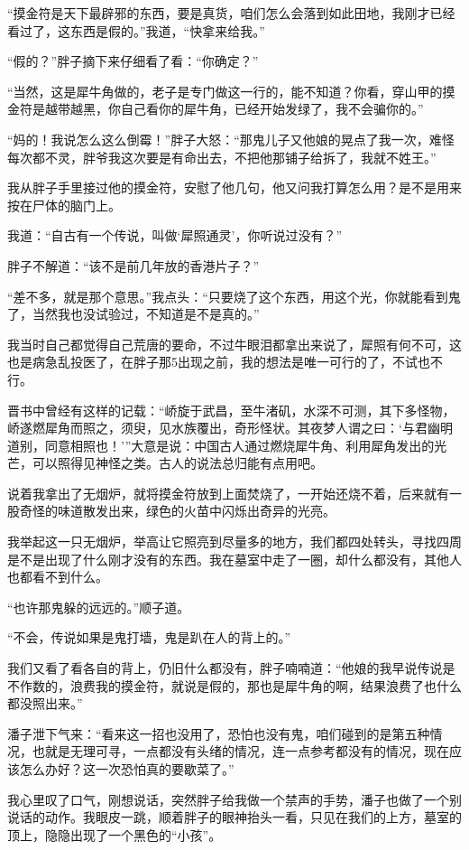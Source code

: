 “摸金符是天下最辟邪的东西，要是真货，咱们怎么会落到如此田地，我刚才已经看过了，这东西是假的。”我道，“快拿来给我。”

“假的？”胖子摘下来仔细看了看：“你确定？”

“当然，这是犀牛角做的，老子是专门做这一行的，能不知道？你看，穿山甲的摸金符是越带越黑，你自己看你的犀牛角，已经开始发绿了，我不会骗你的。”

“妈的！我说怎么这么倒霉！”胖子大怒：“那鬼儿子又他娘的晃点了我一次，难怪每次都不灵，胖爷我这次要是有命出去，不把他那铺子给拆了，我就不姓王。”

我从胖子手里接过他的摸金符，安慰了他几句，他又问我打算怎么用？是不是用来按在尸体的脑门上。

我道：“自古有一个传说，叫做‘犀照通灵’，你听说过没有？”

胖子不解道：“该不是前几年放的香港片子？”

“差不多，就是那个意思。”我点头：“只要烧了这个东西，用这个光，你就能看到鬼了，当然我也没试验过，不知道是不是真的。”

我当时自己都觉得自己荒唐的要命，不过牛眼泪都拿出来说了，犀照有何不可，这也是病急乱投医了，在胖子那5出现之前，我的想法是唯一可行的了，不试也不行。

晋书中曾经有这样的记载：“峤旋于武昌，至牛渚矶，水深不可测，其下多怪物，峤遂燃犀角而照之，须臾，见水族覆出，奇形怪状。其夜梦人谓之曰：‘与君幽明道别，同意相照也！’”大意是说：中国古人通过燃烧犀牛角、利用犀角发出的光芒，可以照得见神怪之类。古人的说法总归能有点用吧。

说着我拿出了无烟炉，就将摸金符放到上面焚烧了，一开始还烧不着，后来就有一股奇怪的味道散发出来，绿色的火苗中闪烁出奇异的光亮。

我举起这一只无烟炉，举高让它照亮到尽量多的地方，我们都四处转头，寻找四周是不是出现了什么刚才没有的东西。我在墓室中走了一圈，却什么都没有，其他人也都看不到什么。

“也许那鬼躲的远远的。”顺子道。

“不会，传说如果是鬼打墙，鬼是趴在人的背上的。”

我们又看了看各自的背上，仍旧什么都没有，胖子喃喃道：“他娘的我早说传说是不作数的，浪费我的摸金符，就说是假的，那也是犀牛角的啊，结果浪费了也什么都没照出来。”

潘子泄下气来：“看来这一招也没用了，恐怕也没有鬼，咱们碰到的是第五种情况，也就是无理可寻，一点都没有头绪的情况，连一点参考都没有的情况，现在应该怎么办好？这一次恐怕真的要歇菜了。”

我心里叹了口气，刚想说话，突然胖子给我做一个禁声的手势，潘子也做了一个别说话的动作。我眼皮一跳，顺着胖子的眼神抬头一看，只见在我们的上方，墓室的顶上，隐隐出现了一个黑色的“小孩”。


